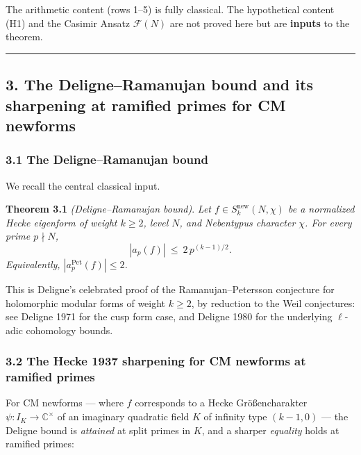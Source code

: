 \documentclass[
  11pt,
  a4paper,
]{amsart}
\begin{document}
The arithmetic content (rows 1--5) is fully classical. The hypothetical content (H1) and the Casimir Ansatz \(\mathcal{F}(N)\) are not proved here but are \textbf{inputs} to the theorem.

\begin{center}\rule{0.5\linewidth}{0.5pt}\end{center}

\hypertarget{the-deligneramanujan-bound-and-its-sharpening-at-ramified-primes-for-cm-newforms}{%
\subsection{3. The Deligne--Ramanujan bound and its sharpening at ramified primes for CM newforms}\label{the-deligneramanujan-bound-and-its-sharpening-at-ramified-primes-for-cm-newforms}}

\hypertarget{the-deligneramanujan-bound}{%
\subsubsection{3.1 The Deligne--Ramanujan bound}\label{the-deligneramanujan-bound}}

We recall the central classical input.

\textbf{Theorem 3.1} \emph{(Deligne--Ramanujan bound)}. \emph{Let \(f \in S_k^{\mathrm{new}}(N, \chi)\) be a normalized Hecke eigenform of weight \(k \ge 2\), level \(N\), and Nebentypus character \(\chi\). For every prime \(p \nmid N\),}
\[
|a_p(f)|\ \le\ 2\, p^{(k-1)/2}.
\]
\emph{Equivalently, \(|a_p^{\mathrm{Pet}}(f)| \le 2\).}

This is Deligne's celebrated proof of the Ramanujan--Petersson conjecture for holomorphic modular forms of weight \(k \ge 2\), by reduction to the Weil conjectures: see Deligne 1971 for the cusp form case, and Deligne 1980 for the underlying \(\ell\)-adic cohomology bounds.

\hypertarget{the-hecke-1937-sharpening-for-cm-newforms-at-ramified-primes}{%
\subsubsection{3.2 The Hecke 1937 sharpening for CM newforms at ramified primes}\label{the-hecke-1937-sharpening-for-cm-newforms-at-ramified-primes}}

For CM newforms --- where \(f\) corresponds to a Hecke Größencharakter \(\psi : I_K \to \mathbb{C}^\times\) of an imaginary quadratic field \(K\) of infinity type \((k-1, 0)\) --- the Deligne bound is \emph{attained} at split primes in \(K\), and a sharper \emph{equality} holds at ramified primes:
\end{document}
